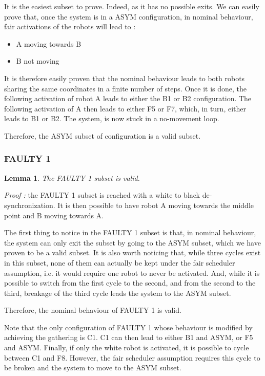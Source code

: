 \documentclass[11pt]{article}
\newtheorem{Lemma}{Lemma}
\begin{document}
It is the easiest subset to prove. Indeed, as it has no possible exits. We can easily prove that, once the system is in a ASYM configuration, in nominal behaviour, fair activations of the robots will lead to :

\begin{itemize}
\item A moving towards B
\item B not moving
\end{itemize}


It is therefore easily proven that the nominal behaviour leads to both robots sharing the same coordinates in a finite number of steps.
Once it is done, the following activation of robot A leads to either the B1 or B2 configuration. The following activation of A then leads to either F5 or F7, which, in turn, either leads to B1 or B2. The system, is now stuck in a no-movement loop.

Therefore, the ASYM subset of configuration is a valid subset.

\subsubsection{FAULTY 1}

\begin{Lemma}
The FAULTY 1 subset is valid.
\end{Lemma}


\textit{Proof :} the FAULTY 1 subset is reached with a white to black de-synchronization.
It is then possible to have robot A moving towards the middle point and B moving towards A.

The first thing to notice in the FAULTY 1 subset is that, in nominal behaviour, the system can only exit the subset by going to the ASYM subset, which we have proven to be a valid subset.
It is also worth noticing that, while three cycles exist in this subset, none of them can actually be kept under the fair scheduler assumption, i.e. it would require one robot to never be activated. And, while it is possible to switch from the first cycle to the second, and from the second to the third, breakage of the third cycle leads the system to the ASYM subset.

Therefore, the nominal behaviour of FAULTY 1 is valid.

Note that the only configuration of FAULTY 1 whose behaviour is modified by achieving the gathering is C1. C1 can then lead to either B1 and ASYM, or F5 and ASYM. Finally, if only the white robot is activated, it is possible to cycle between C1 and F8. However, the fair scheduler assumption requires this cycle to be broken and the system to move to the ASYM subset.
\end{document}
